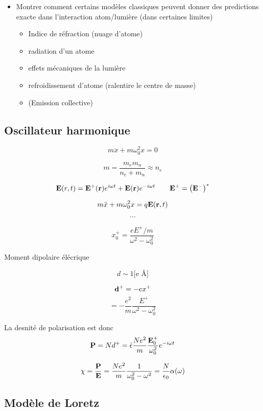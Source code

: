 \begin{tcolorbox}[title=Objectifs]
    \begin{itemize}
     \item Montrer comment certains modèles classiques peuvent donner des predictions exacte dans l'interaction atom/lumière (dans certaines limites)
         \begin{itemize}
             \item Indice de réfraction (nuage d'atome)
                \item radiation d'un atome
                \item effets mécaniques de la lumière
                \item refroidissement d'atome (ralentire le centre de masse)
                \item (Emission collective)
         \end{itemize}
    \end{itemize}
\end{tcolorbox}




\subsection{Oscillateur harmonique}

$$m \ddot x + m\omega_0^{2}x=0 $$ 

$$ m = \frac{m_{e} m_n }{n_e + m_{n}} \approx n_e  $$ 

$$\vb{E}(r,t) = \vb{E}^+ (\vb{r}) e^{i\omega t} + \vb{E}(\vb{r}) e^{-i\omega t} \qquad \vb{E}^+ = \left( \vb{E}^- \right)^*  $$ 


$$m \ddot x + m\omega_0^{2}x=q \vb{E}(\vb{r},t) $$ 

$$\dotsb$$ 

$$\boxed{x_0^{+}= \frac{eE^+/m}{\omega^{2}-\omega_0^{2}} }$$ 

Moment dipolaire élécrique

$$d \sim 1 \text{[e \AA]} $$ 

$$\vb{d}^+ = -ex^+$$ 
$$ = -\frac{e^{2}}{m} \frac{E^+}{\omega^2-\omega_0^2} $$ 


La desnité de polarisation est donc $$\vb{P} = N d^{+}= \hat\epsilon \frac{Ne^{2}}{m} \frac{\vb{E}_0^+}{\omega_0^2} e^{-i \omega t} $$ 

$$\chi = \frac{\vb{P}}{\vb{E}} = \frac{Ne^{2}}{m} \frac{1}{\omega_0^{2}- \omega^2} = \frac{N}{\epsilon_0} \alpha(\omega)$$ 

\subsection{Modèle de Loretz}

